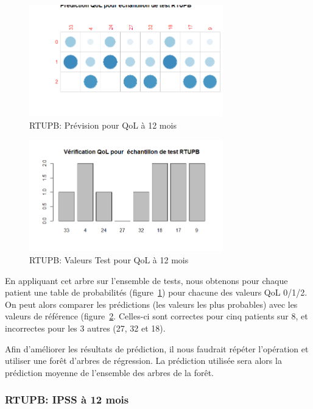 \begin{figure}[H]
\centering
\includegraphics[width=0.75\textwidth]{../Fig/RTUPB/rtupb-regtree-predict-qol12.png}
\caption{RTUPB: Prévision pour QoL à 12 mois}
\label{fig-rtupb-regtree-predict-qol12}
\end{figure}

\begin{figure}[H]
\centering
\includegraphics[width=0.75\textwidth]{../Fig/RTUPB/rtupb-regtree-test-qol12.png}
\caption{RTUPB: Valeurs Test pour QoL à 12 mois}
\label{fig-rtupb-regtree-test-qol12}
\end{figure}

En appliquant cet arbre sur l'ensemble de tests, nous obtenons pour chaque patient une table de probabilités (figure~\ref{fig-rtupb-regtree-predict-qol12}) pour chacune des valeurs QoL 0/1/2. On peut alors comparer les prédictions (les valeurs les plus probables) avec les valeurs de référence (figure~\ref{fig-rtupb-regtree-test-qol12}. Celles-ci sont correctes pour cinq patients sur 8, et incorrectes pour les 3 autres (27, 32 et 18).

Afin d'améliorer les résultats de prédiction, il nous faudrait répéter l'opération et utiliser une forêt d'arbres de régression. La prédiction utilisée sera alors la prédiction moyenne de l'ensemble des arbres de la forêt.

\subsubsection{RTUPB: IPSS à 12 mois}

